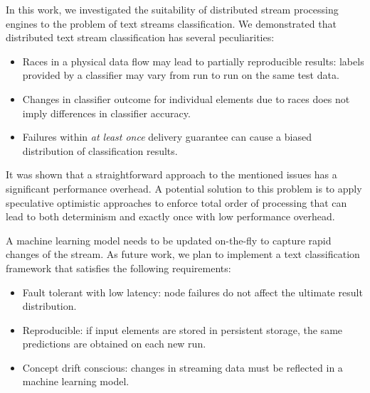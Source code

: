 \label {fs-conclusion}

In this work, we investigated the suitability of distributed stream processing engines to the problem of text streams classification. We demonstrated that distributed text stream classification has several peculiarities:

\begin{itemize}
    \item Races in a physical data flow may lead to partially reproducible results: labels provided by a classifier may vary from run to run on the same test data.
    \item Changes in classifier outcome for individual elements due to races does not imply differences in classifier accuracy. 
    \item Failures within {\em at least once} delivery guarantee can cause a biased distribution of classification results.
\end{itemize}

It was shown that a straightforward approach to the mentioned issues has a significant performance overhead. A potential solution to this problem is to apply speculative optimistic approaches to enforce total order of processing that can lead to both determinism and exactly once with low performance overhead. 

A machine learning model needs to be updated on-the-fly to capture rapid changes of the stream. As future work, we plan to implement a text classification framework that satisfies the following requirements:

\begin{itemize}
    \item Fault tolerant with low latency: node failures do not affect the ultimate result distribution.
    \item Reproducible: if input elements are stored in persistent storage, the same predictions are obtained on each new run.
    \item Concept drift conscious: changes in streaming data must be reflected in a machine learning model.  
\end{itemize}